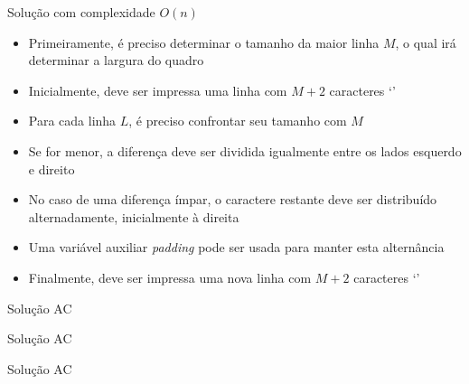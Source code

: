\begin{frame}[fragile]{Solução com complexidade $O(n)$}

    \begin{itemize}
        \item Primeiramente, é preciso determinar o tamanho da maior linha $M$, o qual irá
            determinar a largura do quadro

        \item Inicialmente, deve ser impressa uma linha com $M + 2$ caracteres \lq *\rq

        \item Para cada linha $L$, é preciso confrontar seu tamanho com $M$

        \item Se for menor, a diferença deve ser dividida igualmente entre os lados esquerdo e
            direito

        \item No caso de uma diferença ímpar, o caractere restante deve ser distribuído
            alternadamente, inicialmente à direita

        \item Uma variável auxiliar \textit{padding} pode ser usada para manter esta
            alternância

        \item Finalmente, deve ser impressa uma nova linha com $M + 2$ caracteres \lq *\rq

   \end{itemize}

\end{frame}

\begin{frame}[fragile]{Solução AC}
\end{frame}

\begin{frame}[fragile]{Solução AC}
\end{frame}

\begin{frame}[fragile]{Solução AC}
\end{frame}

